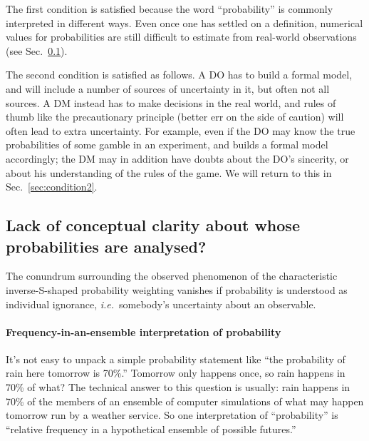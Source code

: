 \documentclass[a4paper, 12pt]{article}
\newcommand{\seclabel}[1]{\label{sec:#1}}
\newcommand{\secref}[1]{Sec.~\ref{sec:#1}}
\newcommand{\ie}{{\it i.e.}\ }
\newcommand{\eg}{{\it e.g.}\ }
\begin{document}
The first condition is satisfied because the word ``probability'' is commonly interpreted in different ways. Even once one has settled on a definition, numerical values for probabilities are still difficult to estimate from real-world observations (see \secref{tricky}).

The second condition is satisfied as follows. A DO has to build a formal model, and will include a number of sources of uncertainty in it, but often not all sources. A DM instead has to make decisions in the real world, and rules of thumb like the precautionary principle (better err on the side of caution) will often lead to extra uncertainty. For example, even if the DO may know the true probabilities of some gamble in an experiment, and builds a formal model accordingly; the DM may in addition have doubts about the DO's sincerity, or about his understanding of the rules of the game. We will return to this in \secref{condition2}.

\subsection{Lack of conceptual clarity about whose probabilities are analysed?} \seclabel{tricky}

The conundrum surrounding the observed phenomenon of the characteristic inverse-S-shaped probability weighting vanishes if probability is understood as individual ignorance, \ie somebody's uncertainty about an observable.

\paragraph{Frequency-in-an-ensemble interpretation of probability}
It's not easy to unpack a simple probability statement like ``the probability of rain here tomorrow is 70\%.'' Tomorrow only happens once, so rain happens in 70\% of what? The technical answer to this question is usually: rain happens in 70\% of the members of an ensemble of computer simulations of what may happen tomorrow run by a weather service. So one interpretation of ``probability'' is ``relative frequency in a hypothetical ensemble of possible futures.'' 
\end{document}
